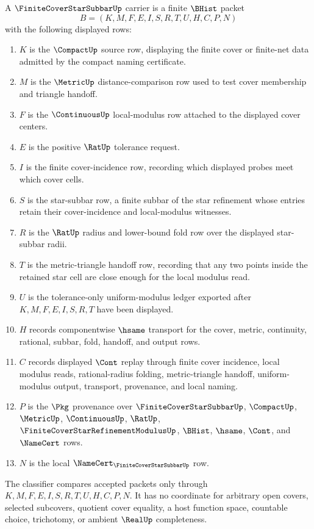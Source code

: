 \begin{definition}\label{def:finite-cover-star-subbar-carrier}
A $\FiniteCoverStarSubbarUp$ carrier is a finite $\BHist$ packet
$$
B=(K,M,F,E,I,S,R,T,U,H,C,P,N)
$$
with the following displayed rows:
\begin{enumerate}
\item $K$ is the $\CompactUp$ source row, displaying the finite cover or finite-net data admitted by the compact naming certificate.
\item $M$ is the $\MetricUp$ distance-comparison row used to test cover membership and triangle handoff.
\item $F$ is the $\ContinuousUp$ local-modulus row attached to the displayed cover centers.
\item $E$ is the positive $\RatUp$ tolerance request.
\item $I$ is the finite cover-incidence row, recording which displayed probes meet which cover cells.
\item $S$ is the star-subbar row, a finite subbar of the star refinement whose entries retain their cover-incidence and local-modulus witnesses.
\item $R$ is the $\RatUp$ radius and lower-bound fold row over the displayed star-subbar radii.
\item $T$ is the metric-triangle handoff row, recording that any two points inside the retained star cell are close enough for the local modulus read.
\item $U$ is the tolerance-only uniform-modulus ledger exported after $K,M,F,E,I,S,R,T$ have been displayed.
\item $H$ records componentwise $\hsame$ transport for the cover, metric, continuity, rational, subbar, fold, handoff, and output rows.
\item $C$ records displayed $\Cont$ replay through finite cover incidence, local modulus reads, rational-radius folding, metric-triangle handoff, uniform-modulus output, transport, provenance, and local naming.
\item $P$ is the $\Pkg$ provenance over $\FiniteCoverStarSubbarUp$, $\CompactUp$, $\MetricUp$, $\ContinuousUp$, $\RatUp$, $\FiniteCoverStarRefinementModulusUp$, $\BHist$, $\hsame$, $\Cont$, and $\NameCert$ rows.
\item $N$ is the local $\NameCert_{\FiniteCoverStarSubbarUp}$ row.
\end{enumerate}
The classifier compares accepted packets only through $K,M,F,E,I,S,R,T,U,H,C,P,N$. It has no coordinate for arbitrary open covers, selected subcovers, quotient cover equality, a host function space, countable choice, trichotomy, or ambient $\RealUp$ completeness.
\end{definition}


